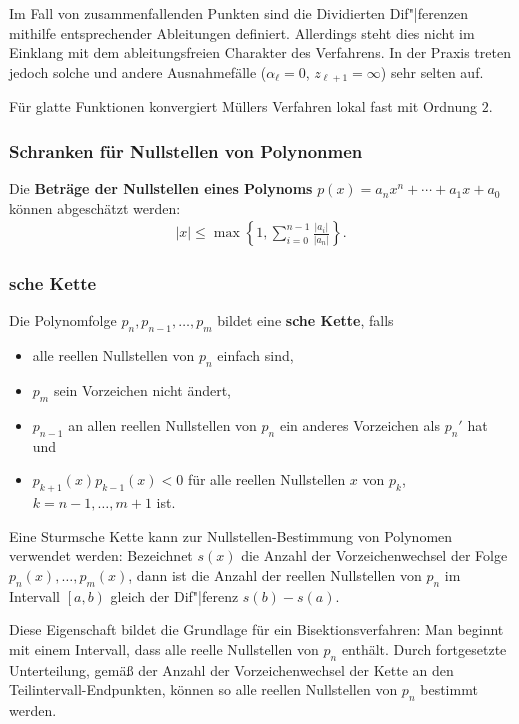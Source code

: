 Im Fall von zusammenfallenden Punkten sind die Dividierten Dif"|ferenzen
mithilfe entsprechender Ableitungen definiert.
Allerdings steht dies nicht im Einklang mit dem ableitungsfreien Charakter
des Verfahrens.
In der Praxis treten jedoch solche und andere Ausnahmefälle
($\alpha_\ell = 0$, $z_{\ell+1} = \infty$) sehr selten auf.

Für glatte Funktionen konvergiert Müllers Verfahren lokal fast mit Ordnung $2$.

\subsubsection{%
    Schranken für Nullstellen von Polynonmen%
}

Die \textbf{Beträge der Nullstellen eines Polynoms}
$p(x) = a_n x^n + \dotsb + a_1 x + a_0$ können abgeschätzt werden:
\begin{align*}
    |x| \le \max\left\{1, \sum_{i=0}^{n-1} \frac{|a_i|}{|a_n|}\right\}.
\end{align*}

\subsubsection{%
    sche Kette%
}

Die Polynomfolge $p_n, p_{n-1}, \dotsc, p_m$ bildet eine
\textbf{sche Kette}, falls
\begin{itemize}
    \item
    alle reellen Nullstellen von $p_n$ einfach sind,
    
    \item
    $p_m$ sein Vorzeichen nicht ändert,
    
    \item
    $p_{n-1}$ an allen reellen Nullstellen von $p_n$ ein anderes Vorzeichen
    als $p_n'$ hat und
    
    \item
    $p_{k+1}(x) p_{k-1}(x) < 0$ für alle reellen Nullstellen $x$ von $p_k$,
    $k = n - 1, \dotsc, m + 1$ ist.
\end{itemize}

Eine Sturmsche Kette kann zur Nullstellen-Bestimmung von Polynomen
verwendet werden:
Bezeichnet $s(x)$ die Anzahl der Vorzeichenwechsel der Folge
$p_n(x), \dotsc, p_m(x)$, dann ist die Anzahl der reellen Nullstellen von $p_n$
im Intervall $\left[a, b\right)$ gleich der Dif"|ferenz $s(b) - s(a)$.

Diese Eigenschaft bildet die Grundlage für ein Bisektionsverfahren:
Man beginnt mit einem Intervall, dass alle reelle Nullstellen von $p_n$
enthält.
Durch fortgesetzte Unterteilung, gemäß der Anzahl der Vorzeichenwechsel der
Kette an den Teilintervall-Endpunkten, können so alle reellen Nullstellen
von $p_n$ bestimmt werden.

